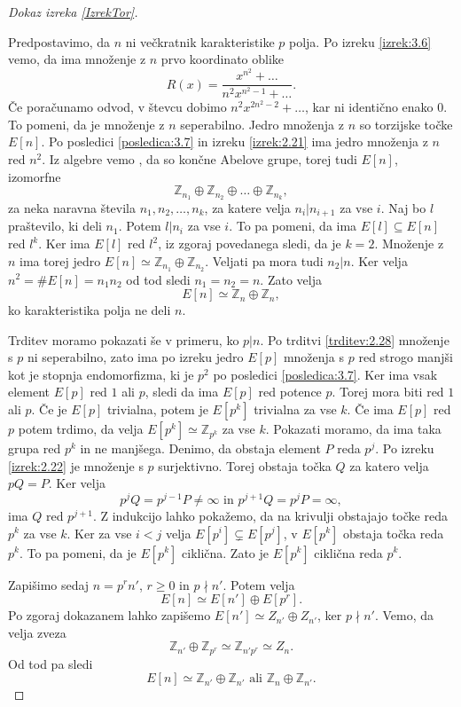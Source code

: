 \documentclass[12pt,a4paper,twoside]{article}
\theoremstyle{definition} %
\theoremstyle{plain} %
\numberwithin{equation}{section}  %
\newcommand{\Z}{\mathbb Z}
\begin{document}
\begin{proof}[Dokaz izreka \ref{IzrekTor}]~

Predpostavimo, da $n$ ni večkratnik karakteristike $p$ polja. Po izreku \ref{izrek:3.6} vemo, da ima množenje z $n$ prvo koordinato oblike
$$R(x) = \frac{x^{n^2}+\ldots}{n^2x^{n^2-1}+ \ldots}.$$
Če poračunamo odvod, v števcu dobimo $n^2x^{2n^2-2}+ \ldots$, kar ni identično enako $0$. To pomeni, da je množenje z $n$ seperabilno. Jedro množenja z $n$ so torzijske točke $E[n]$. Po posledici \ref{posledica:3.7} in izreku \ref{izrek:2.21} ima jedro množenja z $n$ red $n^2$. Iz algebre vemo \cite{predavanja}, da so končne Abelove grupe, torej tudi  $E[n]$, izomorfne
$$\Z_{n_1} \oplus \Z_{n_2} \oplus \ldots \oplus \Z_{n_k},$$
za neka naravna števila $n_1,n_2,\ldots,n_k$, za katere velja $n_i|n_{i+1}$  za vse $i$. Naj bo $l$ praštevilo, ki deli $n_1$. Potem $l|n_i$ za vse $i$. To pa pomeni, da ima $E[l] \subseteq E[n]$ red $l^k$. Ker ima $E[l]$ red $l^2$, iz zgoraj povedanega sledi, da je $k=2$. Množenje z $n$ ima torej jedro $E[n] \simeq \Z_{n_1} \oplus \Z_{n_2}$. Veljati pa mora tudi $n_2|n$. Ker velja $n^2=\#E[n] = n_1n_2$ od tod sledi $n_1=n_2=n$. Zato velja
$$E[n] \simeq \Z_n \oplus \Z_n,$$
ko karakteristika polja ne deli $n$.

Trditev moramo pokazati še v primeru, ko $p|n$. Po trditvi \ref{trditev:2.28} množenje s $p$ ni seperabilno, zato ima po izreku \cite{izrek:2.21} jedro $E[p]$ množenja s $p$ red strogo manjši kot je stopnja endomorfizma, ki je $p^2$ po posledici \ref{posledica:3.7}. Ker ima vsak element $E[p]$ red $1$ ali $p$, sledi da ima $E[p]$ red potence $p$. Torej mora biti red $1$ ali $p$. Če je $E[p]$ trivialna, potem je $E[p^k]$ trivialna za vse $k$. Če ima $E[p]$ red $p$ potem trdimo, da velja $E[p^k] \simeq \Z_{p ^k}$ za vse $k$. Pokazati moramo, da ima taka grupa red $p^k$ in ne manjšega. Denimo, da obstaja element $P$ reda $p^j$. Po izreku \ref{izrek:2.22} je množenje s $p$ surjektivno. Torej obstaja točka $Q$ za katero velja $pQ = P$. Ker velja
$$p^jQ = p^{j-1}P \neq \infty \text{ in } p^{j+1}Q = p^jP = \infty,$$
ima $Q$ red $p^{j+1}$. Z indukcijo lahko pokažemo, da na krivulji obstajajo točke reda $p^k$ za vse $k$.
Ker za vse $i < j$ velja $E[p^{i}] \subsetneq E[p^j]$, v $E[p^k]$ obstaja točka reda $p^k$. To pa pomeni, da je $E[p^k]$ ciklična. Zato je $E[p^k]$ ciklična reda $p^k$.

Zapišimo sedaj $n=p^rn'$, $r\geq0$ in $p\nmid n'$. Potem velja
$$E[n] \simeq E[n'] \oplus E[p^r].$$
Po zgoraj dokazanem lahko zapišemo $E[n'] \simeq Z_{n'} \oplus Z_{n'}$, ker $p \nmid n'$. Vemo, da velja zveza
$$\Z_{n'} \oplus \Z_{p^r} \simeq \Z_{n'p^r} \simeq Z_n.$$
Od tod pa sledi
$$E[n] \simeq \Z_{n'} \oplus \Z_{n'} \text{ ali } \Z_n \oplus \Z_{n'}.$$
\end{proof}
\end{document}
